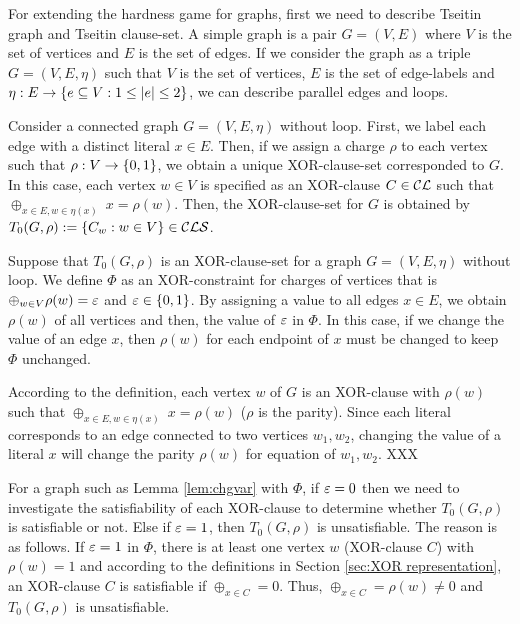 \documentclass{report}
\begin{document}
For extending the hardness game for graphs, first we need to describe Tseitin graph and Tseitin clause-set. A simple graph is a pair $G = (V,E)$ where $V$ is the set of vertices and $E$ is the set of edges. If we consider the graph as a triple $G = (V,E,\eta)$ such that $V$ is the set of vertices, $E$ is the set of edge-labels and $\eta: E \rightarrow \{ e \subseteq V : 1 \le \lvert e \rvert \le 2 \}$, we can describe parallel edges and loops. 

Consider a connected graph $G=(V,E,\eta)$ without loop. First, we label each edge with a distinct literal $x \in E$. Then, if we assign a charge $\rho$ to each vertex such that $\rho: V \rightarrow \{ 0,1 \}$, we obtain a unique XOR-clause-set corresponded to $G$. In this case, each vertex $w \in V$ is specified as an XOR-clause $C \in \mathcal{CL}$ such that $\oplus_{x \in E, w \in \eta(x)} \; x = \rho(w)$. Then, the XOR-clause-set for $G$ is obtained by $T_0(G,\rho) := \{ C_w : w \in V \} \in \mathcal{CLS}$. 

\begin{lem}\label{lem:chgvar}
Suppose that $T_0(G,\rho)$ is an XOR-clause-set for a graph $G=(V,E,\eta)$ without loop. We define $\Phi$ as an XOR-constraint for charges of vertices that is $\oplus_{w \in V} \rho(w) = \varepsilon$ and $\varepsilon \in \{ 0,1 \}$. By assigning a value to all edges $x \in E$, we obtain $\rho(w)$ of all vertices and then, the value of $\varepsilon$ in $\Phi$. In this case, if we change the value of an edge $x$, then $\rho(w)$ for each endpoint of $x$ must be changed to keep $\Phi$ unchanged.
\end{lem}
\begin{prf}
According to the definition, each vertex $w$ of $G$ is an XOR-clause with $\rho(w)$ such that  $\oplus_{x \in E, w \in \eta(x)} \; x = \rho(w)$ ($\rho$ is the parity). Since each literal corresponds to an edge connected to two vertices $w_1, w_2$, changing the value of a literal $x$ will change the parity $\rho(w)$ for equation of $w_1, w_2$. XXX
\end{prf}

For a graph such as Lemma \ref{lem:chgvar} with $\Phi$, if $\varepsilon=0$ then we need to investigate the satisfiability of each XOR-clause to determine whether $T_0(G,\rho)$ is satisfiable or not. Else if $\varepsilon=1$, then $T_0(G,\rho)$ is unsatisfiable. The reason is as follows. If $\varepsilon=1$ in $\Phi$, there is at least one vertex $w$ (XOR-clause $C$) with $ \rho(w) =1$ and according to the definitions in Section \ref{sec:XOR representation}, an XOR-clause $C$ is satisfiable if $\oplus_{x \in C} = 0$. Thus, $\oplus_{x \in C} = \rho(w) \not =0$ and $T_0(G,\rho)$ is unsatisfiable.
\end{document}
